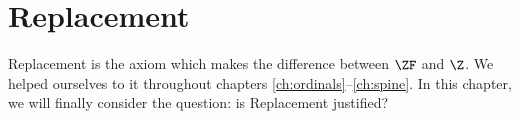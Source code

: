 \documentclass[../../../include/open-logic-chapter]{subfiles}
\begin{document}
\chapter{Replacement}\label{ch:replacement}

Replacement is the axiom which makes the difference between $\ZF$ and $\Z$. We helped ourselves to it throughout chapters \ref{ch:ordinals}--\ref{ch:spine}. In this chapter, we will finally consider the question: is Replacement justified?


\OLEndChapterHook
\end{document}
